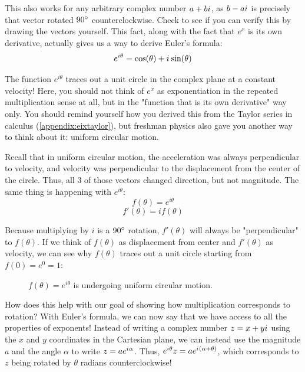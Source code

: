 \documentclass[12pt]{article}
\newcommand{\iu}{{i\mkern1mu}}
\begin{document}
This also works for any arbitrary complex number $a + b \iu$, as $b - a \iu$ is precisely that vector rotated $90\degree$ counterclockwise. Check to see if you can verify this by drawing the vectors yourself. This fact, along with the fact that $e^x$ is its own derivative, actually gives us a way to derive Euler's formula:
\[
e^{i\theta} = \cos(\theta) + \iu \sin(\theta)
\]

The function $e^{i\theta}$ traces out a unit circle in the complex plane at a constant velocity! Here, you should not think of $e^x$ as exponentiation in the repeated multiplication sense at all, but in the "function that is its own derivative" way only. You should remind yourself how you derived this from the Taylor series in calculus (\ref{appendix:eixtaylor}), but freshman physics also gave you another way to think about it: uniform circular motion. 

Recall that in uniform circular motion, the acceleration was always perpendicular to velocity, and velocity was perpendicular to the displacement from the center of the circle. Thus, all 3 of those vectors changed direction, but not magnitude. The same thing is happening with $e^{i\theta}$:
\[
f(\theta) = e^{i\theta}
\]
\[
f'(\theta) = i f(\theta)
\]

Because multiplying by $i$ is a $90\degree$ rotation, $f'(\theta)$ will always be "perpendicular" to $f(\theta)$. If we think of $f(\theta)$ as displacement from center and $f'(\theta)$ as velocity, we can see why $f(\theta)$ traces out a unit circle starting from $f(0) = e^0 = 1$:

\begin{figure}[h]
    \centering
    \caption{$f(\theta)=e^{i\theta}$ is undergoing uniform circular motion.}
    \label{uniformcircular}
\end{figure}

How does this help with our goal of showing how multiplication corresponds to rotation? With Euler's formula, we can now say that we have access to all the properties of exponents! Instead of writing a complex number $z = x + y\iu$ using the $x$ and $y$ coordinates in the Cartesian plane, we can instead use the magnitude $a$ and the angle $\alpha$ to write $z = a e^{\iu \alpha}$. Thus, $e^{i \theta} z = a e^{\iu (\alpha + \theta)}$, which corresponds to $z$ being rotated by $\theta$ radians counterclockwise!
\end{document}
